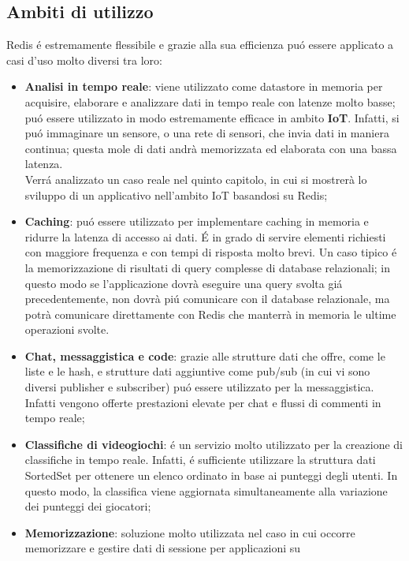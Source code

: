 \subsection{Ambiti di utilizzo}
Redis é estremamente flessibile e grazie alla sua efficienza puó essere applicato a casi d'uso molto diversi tra loro:
\begin{itemize}
    \item \textbf{Analisi in tempo reale}: viene utilizzato come datastore in memoria per acquisire, elaborare e analizzare dati in tempo reale
    con latenze molto basse; puó essere utilizzato in modo estremamente efficace in ambito \textbf{IoT}. Infatti, si puó immaginare un sensore, o una rete di sensori, che invia
    dati in maniera continua; questa mole di dati andrà memorizzata ed elaborata con una bassa latenza.\\
    Verrá analizzato un caso reale nel quinto capitolo, in cui si mostrerà lo sviluppo di un applicativo nell'ambito
    IoT basandosi su Redis;
    \item \textbf{Caching}: puó essere utilizzato per implementare caching in memoria e ridurre la latenza di accesso ai dati. É in grado
    di servire elementi richiesti con maggiore frequenza e con tempi di risposta molto brevi. Un caso tipico é la memorizzazione
    di risultati di query complesse di database relazionali; in questo modo se l'applicazione dovrà eseguire una query svolta giá precedentemente,
    non dovrà piú comunicare con il database relazionale, ma potrà comunicare direttamente con Redis che manterrà in memoria le ultime operazioni svolte.
    \item \textbf{Chat, messaggistica e code}: grazie alle strutture dati che offre, come le liste e le hash, e strutture dati aggiuntive come pub/sub
    (in cui vi sono diversi publisher e subscriber) puó essere utilizzato per la messaggistica. Infatti vengono offerte prestazioni elevate per
    chat e flussi di commenti in tempo reale;
    \item \textbf{Classifiche di videogiochi}: é un servizio molto utilizzato per la creazione di classifiche in tempo reale. Infatti, é
    sufficiente utilizzare la struttura dati SortedSet per ottenere un elenco ordinato in base ai punteggi degli utenti. In questo modo, la classifica
    viene aggiornata simultaneamente alla variazione dei punteggi dei giocatori;
    \item \textbf{Memorizzazione}: soluzione molto utilizzata nel caso in cui occorre memorizzare e gestire dati di sessione per applicazioni su

\end{itemize}
